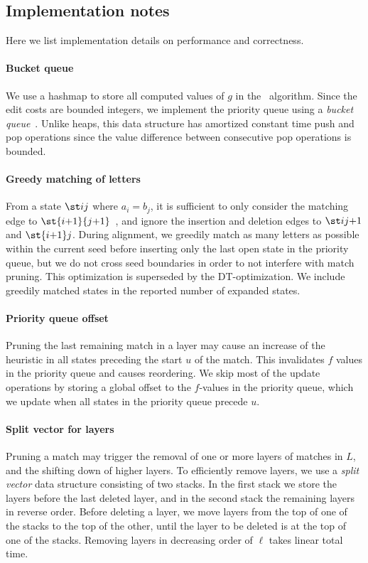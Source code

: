 \subsection{Implementation notes}\label{sec:impl}

Here we list implementation details on performance and correctness.

\paragraph{Bucket queue}
We use a hashmap to store all computed values of $g$ in the \A~algorithm. Since
the edit costs are bounded integers, we implement the priority queue using a
\emph{bucket queue}~\citep{bertsekas1991linear}. Unlike heaps, this data
structure has amortized constant time push and pop operations since the value
difference between consecutive pop operations is bounded.

\paragraph{Greedy matching of letters}
From a state $\st ij$ where $a_i = b_j$, it is sufficient to only consider the
matching edge to $\st
{i{+}1}{j{+}1}$~\citep{allison_lazy_1992,ivanov2020astarix}, and ignore the
insertion and deletion edges to $\st i{j{+}1}$ and $\st {i{+}1}j$. During
alignment, we greedily match as many letters as possible within the current seed
before inserting only the last open state in the priority queue, but we do not
cross seed boundaries in order to not interfere with match pruning. This
optimization is superseded by the DT-optimization. We include greedily matched
states in the reported number of expanded states.

\paragraph{Priority queue offset}
Pruning the last remaining match in a layer may cause an increase of the
heuristic in all states preceding the start $u$ of the match. This invalidates
$f$ values in the priority queue and causes reordering. We skip most of the
update operations by storing a global offset to the $f$-values in the priority
queue, which we update when all states in the priority queue precede $u$.

\paragraph{Split vector for layers}
Pruning a match may trigger the removal of one or more layers of matches in $L$, and the
shifting down of higher layers. To efficiently remove layers, we use a
\emph{split vector} data structure consisting of two stacks. In the first stack
we store the layers before the last deleted layer, and in the second stack the
remaining layers in reverse order. Before deleting a layer, we move layers from
the top of one of the stacks to the top of the other, until the layer to be
deleted is at the top of one of the stacks. Removing layers in decreasing order
of $\ell$ takes linear total time.


